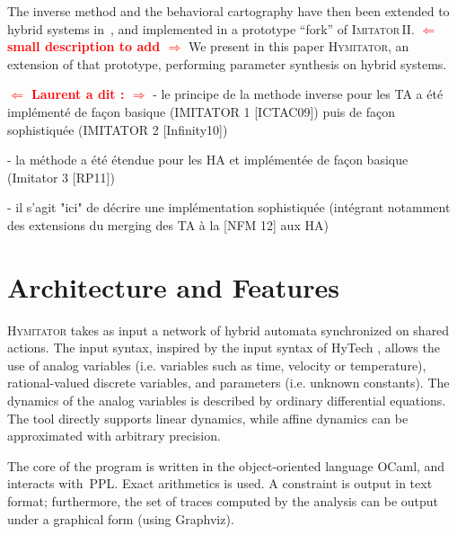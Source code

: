\documentclass{llncs}
\newcommand{\graphviz}{Graphviz}
\newcommand{\hytech}{{\sc HyTech}}
\newcommand{\imitator}{\textsc{Imitator}}
\newcommand{\imitatordeux}{\textsc{Imitator}\,II}
\newcommand{\hymitator}{\textsc{Hymitator}}
\newcommand{\commentaire}[1]{\textcolor{red}{\textbf{$\Leftarrow$  #1 $\Rightarrow$}}}
\begin{document}
The inverse method and the behavioral cartography have then been extended to hybrid systems in~\cite{FK11}, and implemented in a prototype ``fork'' of \imitatordeux{}.
\commentaire{small description to add}
We present in this paper \hymitator{}, an extension of that prototype, performing parameter synthesis on hybrid systems.





\commentaire{Laurent a dit :}
- le principe de la methode inverse pour les TA a été implémenté de façon basique (IMITATOR 1 [ICTAC09])
puis de façon sophistiquée (IMITATOR 2 [Infinity10])

- la méthode a été étendue pour les HA et implémentée de façon basique (Imitator 3 [RP11])

- il s'agit "ici" de décrire une implémentation sophistiquée (intégrant notamment des extensions
du merging des TA  à la  [NFM 12] aux HA)


\section{Architecture and Features}

\hymitator{} takes as input a network of hybrid automata synchronized on shared actions.
The input syntax, inspired by the input syntax of \hytech{}%
, allows the use of analog variables (i.e. variables such as time, velocity or temperature), rational-valued discrete variables, and parameters (i.e. unknown constants). The dynamics of the analog variables is described by ordinary differential equations. The tool directly supports linear dynamics, while affine dynamics can be approximated with arbitrary precision.

The core of the program is written in the object-oriented language OCaml, and interacts with~PPL.
Exact arithmetics is used.
A constraint is output in text format; furthermore, the set of traces computed by the analysis can be output under a graphical form (using \graphviz{}).
\end{document}
